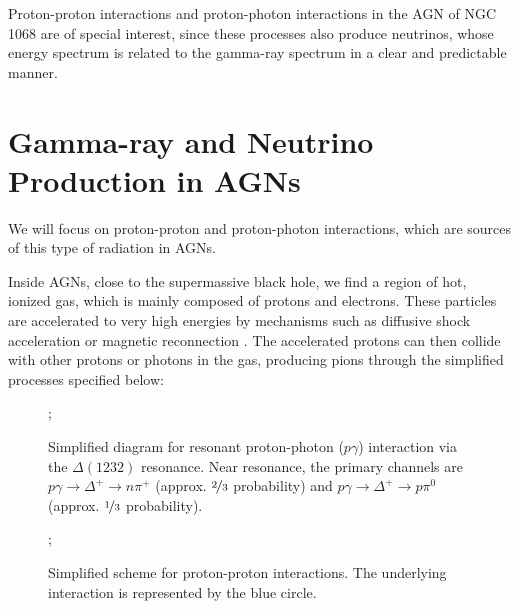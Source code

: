Proton-proton interactions and proton-photon interactions in the AGN of NGC 1068 are of special interest, since these processes also produce neutrinos, whose energy spectrum is related to the gamma-ray spectrum in a clear and predictable manner.


\section{Gamma-ray and Neutrino Production in AGNs}

We will focus on proton-proton and proton-photon interactions, which are sources of this type of radiation in AGNs.

Inside AGNs, close to the supermassive black hole, we find a region of hot, ionized gas, which is mainly composed of protons and electrons. These particles are accelerated to very high energies by mechanisms such as diffusive shock acceleration or magnetic reconnection \citep{padovani2024highenergyneutrinosvicinitysupermassive}. The accelerated protons can then collide with other protons or photons in the gas, producing pions through the simplified processes specified below:


\begin{figure}[H]
    \centering
    ;
    \caption{Simplified diagram for resonant proton-photon ($p\gamma$) interaction via the $\Delta(1232)$ resonance. Near resonance, the primary channels are $p\gamma \rightarrow \Delta^+ \rightarrow n\pi^+$ (approx. $\nicefrac{2}{3}$ probability) and $p\gamma \rightarrow \Delta^+ \rightarrow p\pi^0$ (approx. $\nicefrac{1}{3}$ probability).}
  \end{figure}

\begin{figure}[H]
  \centering
  ;
  \caption{Simplified scheme for proton-proton interactions. The underlying interaction is represented by the blue circle.}

\end{figure}

